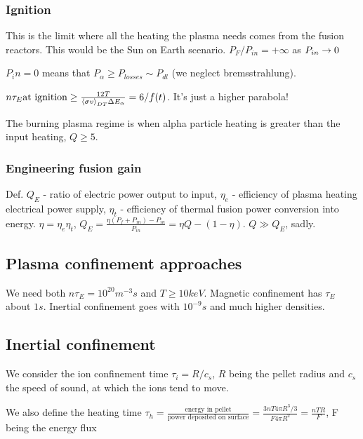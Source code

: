 \documentclass[PlasmaNotes.tex]{subfiles}
\begin{document}
\subsubsection{Ignition}

This is the limit where all the heating the plasma needs comes from the fusion reactors. This would be the Sun on Earth scenario. $P_F/P_{in} = +\infty$ as $P_{in} \rightarrow 0$

$P_in = 0$ means that $P_\alpha \geq P_{losses} \sim P_{dl}$ (we neglect bremsstrahlung).

$n \tau_E \text{at ignition} \geq \frac{12 T}{\left< \sigma v \right>_{DT} \Delta E_\alpha} = 6/f(t)$. It's just a higher parabola!


The burning plasma regime is when alpha particle heating is greater than the input heating, $Q \geq 5$.

\subsubsection{Engineering fusion gain}

Def. $Q_E$ - ratio of electric power output to input, $\eta_e$ - efficiency of plasma heating electrical power supply, $\eta_t$ - efficiency of thermal fusion power conversion into energy. $\eta = \eta_e \eta_t$, $Q_E=\frac{\eta(P_f + P_{in}) - P_{in}}{P_{in}} = \eta Q - (1-\eta)$. $Q \gg Q_E$, sadly.

\subsection{Plasma confinement approaches}

We need both $n \tau_E = 10^{20} m^{-3} s$ and $T\geq 10 keV$. Magnetic confinement has $\tau_E$ about $1s$. Inertial confinement goes with $10^{-9}s$ and much higher densities.



\subsection{Inertial confinement}

We consider the ion confinement time $\tau_i = R/c_s$, $R$ being the pellet radius and $c_s$ the speed of sound, at which the ions tend to move.

We also define the heating time $\tau_h=\frac{\text{energy in pellet}}{\text{power deposited on surface}}=\frac{3nT 4\pi R^3/3}{F 4 \pi R^2} = \frac{n T R}{F}$, F being the energy flux
\end{document}
